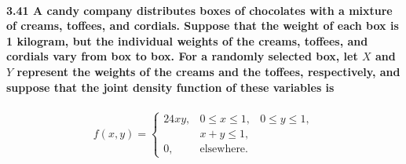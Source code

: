 \documentclass{article}
\begin{document}
\paragraph{3.41 A candy company distributes boxes of chocolates with a 
mixture of creams, toffees, and cordials. Suppose that the weight of 
each box is 1 kilogram, but the individual weights of the creams, 
toffees, and cordials vary from box to box. For a randomly selected box, 
let $X$ and $Y$ represent the weights of the creams and the toffees, 
respectively, and suppose that the joint density function of these 
variables is}
\begin{eqnarray*}
f(x,y)= \left\{ \begin{array}{lll}
	24xy, & 0 \leq x \leq 1, & 0 \leq y \leq 1,\\
	& x + y \leq 1,\\
	0, & \mbox{elsewhere.}
	\end{array} \right.
\end{eqnarray*}
\end{document}
